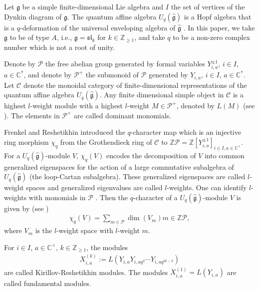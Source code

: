 \documentclass[12pt, reqno]{amsart}
\theoremstyle{plain}
\theoremstyle{definition}
\numberwithin{equation}{section}
\newcommand{\CC}{{\mathbb {C}}}
\newcommand{\ZZ}{{\mathbb {Z}}}
\begin{document}
Let $\mathfrak{g}$ be a simple finite-dimensional Lie algebra and $I$ the set of vertices of the Dynkin diagram of $\mathfrak{g}$. The quantum affine algebra $U_q(\widehat{\mathfrak{g}})$ is a Hopf algebra that is a $q$-deformation of the universal enveloping algebra of $\widehat{\mathfrak{g}}$ \cite{Drin87, Jim85}. In this paper, we take $\mathfrak{g}$ to be of type $A$, i.e., $\mathfrak{g}=\mathfrak{sl}_k$ for $k \in \ZZ_{\ge 1}$, and take $q$ to be a non-zero complex number which is not a root of unity. 

Denote by $\mathcal{P}$ the free abelian group generated by formal variables $Y_{i, a}^{\pm 1}$, $i \in I$, $a \in \CC^*$, and denote by $\mathcal{P}^+$ the submonoid of $\mathcal{P}$ generated by $Y_{i, a}$, $i \in I$, $a \in \CC^*$. Let $\mathcal{C}$ denote the monoidal category of finite-dimensional representations of the quantum affine algebra $U_q(\widehat{\mathfrak{g}})$. Any finite dimensional simple object in $\mathcal{C}$ is a highest $l$-weight module with a highest $l$-weight $M \in \mathcal{P}^+$, denoted by $L(M)$ (see \cite{CP95a}). The elements in $\mathcal{P}^+$ are called dominant monomials.  

Frenkel and Reshetikhin \cite{FR98} introduced the $q$-character map which is an injective ring morphism $\chi_q$ from the Grothendieck ring of $\mathcal{C}$ to $\mathbb{Z}\mathcal{P} = \mathbb{Z}[Y_{i, a}^{\pm 1}]_{i\in I, a\in \mathbb{C}^{\times}}$. For a $U_q(\widehat{\mathfrak{g}})$-module $V$, $\chi_q(V)$ encodes the decomposition of $V$ into common generalized eigenspaces for the action of a large commutative subalgebra of $U_q(\widehat{\mathfrak{g}})$ (the loop-Cartan subalgebra). These generalized eigenspaces are called $l$-weight spaces and generalized eigenvalues are called $l$-weights. One can identify $l$-weights with monomials in $\mathcal{P}$ \cite{FR98}. Then
the $q$-character of a $U_q(\widehat{\mathfrak{g}})$-module $V$ is given by (see \cite{FR98})
\begin{align*}
\chi_q(V) = \sum_{  m \in \mathcal{P}} \dim(V_{m}) m \in \mathbb{Z}\mathcal{P},
\end{align*}
where $V_{m}$ is the $l$-weight space with $l$-weight $m$. 

For $i \in I$, $a \in \mathbb{C}^{\times}$, $k \in \ZZ_{\ge 1}$, the modules
\begin{align*}
X_{i,a}^{(k)} := L(Y_{i,a} Y_{i,aq^2} \cdots Y_{i,aq^{2k-2}})
\end{align*}
are called Kirillov-Reshetikhin modules. The modules $X_{i,a}^{(1)} = L(Y_{i,a})$ are called fundamental modules. 
	
\end{document}
